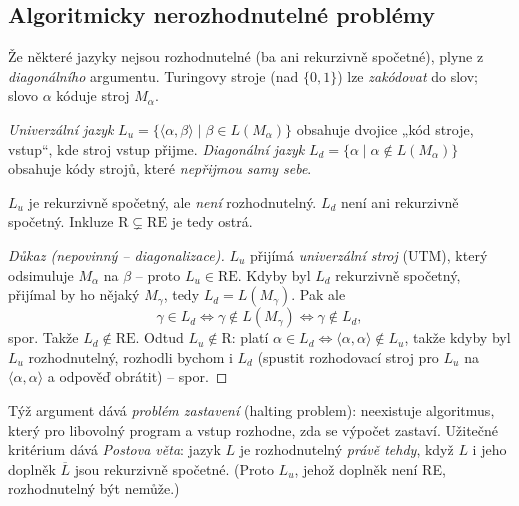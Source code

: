 \documentclass[11pt,a4paper]{article}
\begin{document}
\subsection{Algoritmicky nerozhodnutelné problémy}

Že některé jazyky nejsou rozhodnutelné (ba ani rekurzivně spočetné), plyne z \emph{diagonálního} argumentu. Turingovy stroje (nad $\{0,1\}$) lze \emph{zakódovat} do slov; slovo $\alpha$ kóduje stroj $M_\alpha$.

\begin{definice}
\emph{Univerzální jazyk} $L_u=\{\langle\alpha,\beta\rangle\mid \beta\in L(M_\alpha)\}$ obsahuje dvojice „kód stroje, vstup``, kde stroj vstup přijme. \emph{Diagonální jazyk} $L_d=\{\alpha\mid \alpha\notin L(M_\alpha)\}$ obsahuje kódy strojů, které \emph{nepřijmou samy sebe}.
\end{definice}

\begin{veta}[Nerozhodnutelnost]
$L_u$ je rekurzivně spočetný, ale \emph{není} rozhodnutelný. $L_d$ není ani rekurzivně spočetný. Inkluze $\mathrm R\subsetneq\mathrm{RE}$ je tedy ostrá.
\end{veta}

\begin{proof}[Důkaz \textnormal{(nepovinný -- diagonalizace)}]
$L_u$ přijímá \emph{univerzální stroj} (UTM), který odsimuluje $M_\alpha$ na $\beta$ -- proto $L_u\in\mathrm{RE}$. Kdyby byl $L_d$ rekurzivně spočetný, přijímal by ho nějaký $M_\gamma$, tedy $L_d=L(M_\gamma)$. Pak ale
\[ \gamma\in L_d \iff \gamma\notin L(M_\gamma) \iff \gamma\notin L_d, \]
spor. Takže $L_d\notin\mathrm{RE}$. Odtud $L_u\notin\mathrm R$: platí $\alpha\in L_d\iff\langle\alpha,\alpha\rangle\notin L_u$, takže kdyby byl $L_u$ rozhodnutelný, rozhodli bychom i $L_d$ (spustit rozhodovací stroj pro $L_u$ na $\langle\alpha,\alpha\rangle$ a odpověď obrátit) -- spor.
\end{proof}

\begin{poznamka}
Týž argument dává \emph{problém zastavení} (halting problem): neexistuje algoritmus, který pro libovolný program a vstup rozhodne, zda se výpočet zastaví. Užitečné kritérium dává \emph{Postova věta}: jazyk $L$ je rozhodnutelný \emph{právě tehdy}, když $L$ i jeho doplněk $\overline L$ jsou rekurzivně spočetné. (Proto $L_u$, jehož doplněk není RE, rozhodnutelný být nemůže.)
\end{poznamka}
\end{document}
